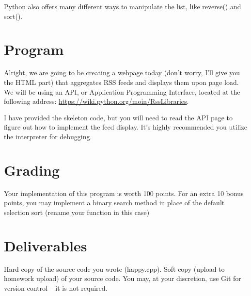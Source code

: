 \documentclass[letterpaper,12pt]{article}
\begin{document}
Python also offers many different ways to manipulate the list, like reverse() and sort().

\section*{Program}
Alright, we are going to be creating a webpage today (don't worry, I'll give you the HTML part)
that aggregates RSS feeds and displays them upon page load. We will be using an API, or Application
Programming Interface, located at the following address: \url{https://wiki.python.org/moin/RssLibraries}.

I have provided the skeleton code, but you will need to read the API page to figure out how to implement
the feed display. It's highly recommended you utilize the interpreter for debugging.


\section*{Grading}
Your implementation of this program is worth 100 points. For an extra 10 bonus points,
you may implement a binary search method in place of the default selection sort (rename your function in this case)


\section*{Deliverables}
Hard copy of the source code you wrote (happy.cpp). Soft copy (upload to homework upload) of
your source code. You may, at your discretion, use Git for version control -- it is not required.

\end{document}
